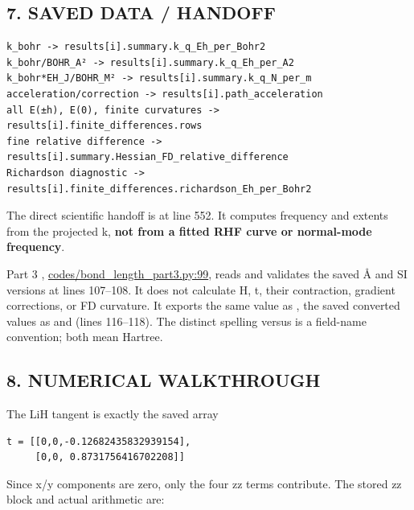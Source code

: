 \documentclass[10pt,a4paper]{article}
\begin{document}
\subsection{7. SAVED DATA / HANDOFF}
\begin{Verbatim}
k_bohr -> results[i].summary.k_q_Eh_per_Bohr2
k_bohr/BOHR_A² -> results[i].summary.k_q_Eh_per_A2
k_bohr*EH_J/BOHR_M² -> results[i].summary.k_q_N_per_m
acceleration/correction -> results[i].path_acceleration
all E(±h), E(0), finite curvatures -> results[i].finite_differences.rows
fine relative difference -> results[i].summary.Hessian_FD_relative_difference
Richardson diagnostic -> results[i].finite_differences.richardson_Eh_per_Bohr2
\end{Verbatim}
The direct scientific handoff is  at line 552. It computes frequency and extents from the projected k, \textbf{not from a fitted RHF curve or normal-mode frequency}.

Part 3 , \href{/Users/novaz/Desktop/qml2.0/codes/bond\_length\_part3.py:99}{codes/bond\_length\_part3.py:99}, reads  and validates the saved Å and SI versions at lines 107–108. It does not calculate H, t, their contraction, gradient corrections, or FD curvature. It exports the same value as , the saved converted values as  and  (lines 116–118). The distinct spelling  versus  is a field-name convention; both mean Hartree.

\subsection{8. NUMERICAL WALKTHROUGH}
The LiH tangent is exactly the saved array

\begin{Verbatim}
t = [[0,0,-0.12682435832939154],
     [0,0, 0.8731756416702208]]
\end{Verbatim}
Since x/y components are zero, only the four zz terms contribute. The stored zz block and actual arithmetic are:
\end{document}
